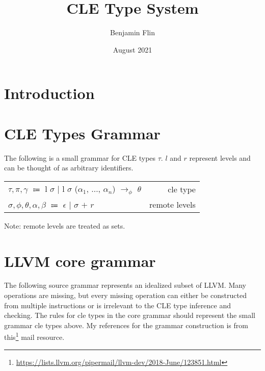 \documentclass{article}
\title{CLE Type System}
\author{Benjamin Flin}
\date{August 2021}
\begin{document}
\maketitle

\section{Introduction}
\section{CLE Types Grammar}
The following is a small grammar for CLE types $\tau$. 
$l$ and $r$ represent levels and can be thought of as arbitrary identifiers.

\begin{center}
\begin{tabular}{ l r }
    $\tau, \pi, \gamma$ $\Coloneqq$ l $\sigma$ $\mid$ l $\sigma$ ($\alpha_1$, $\dots$, $\alpha_n$) $\rightarrow_\phi$ $\theta$ & cle type \\
    $\sigma, \phi, \theta, \alpha, \beta$ $\Coloneqq$ $\epsilon$ $\mid$ $\sigma$ $+$ $r$ & remote levels \\
\end{tabular}
\end{center}
Note: remote levels are treated as sets.

\section{LLVM core grammar}

The following source grammar represents an idealized subset of LLVM. 
Many operations are missing, but every missing operation can either be constructed from multiple instructions or is irrelevant to the CLE type inference and checking. 
The rules for cle types in the core grammar should represent the small grammar cle types above.
My references for the grammar construction is from this\footnote{\url{https://lists.llvm.org/pipermail/llvm-dev/2018-June/123851.html}} mail resource.
\end{document}
